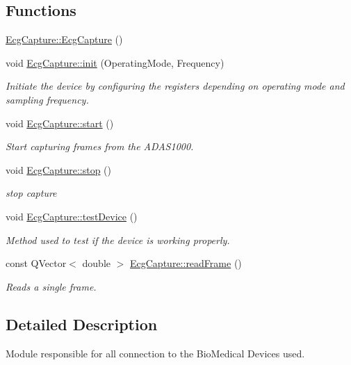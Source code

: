 \subsection*{Functions}
\begin{DoxyCompactItemize}
\item 
\hyperlink{group__Device-Facade_gaeef1c0708b94ee82330d6d165a2b5a71}{Ecg\+Capture\+::\+Ecg\+Capture} ()
\item 
void \hyperlink{group__Device-Facade_ga8f080b59e8caab0993bb7ee6b872b6a0}{Ecg\+Capture\+::init} (Operating\+Mode, Frequency)
\begin{DoxyCompactList}\small\item\em Initiate the device by configuring the registers depending on operating mode and sampling frequency. \end{DoxyCompactList}\item 
void \hyperlink{group__Device-Facade_ga9582047c81db34a3cab2bb315fcb1793}{Ecg\+Capture\+::start} ()
\begin{DoxyCompactList}\small\item\em Start capturing frames from the A\+D\+A\+S1000. \end{DoxyCompactList}\item 
void \hyperlink{group__Device-Facade_ga8fef74cdd0296256ab4a700dae2d02a4}{Ecg\+Capture\+::stop} ()
\begin{DoxyCompactList}\small\item\em stop capture \end{DoxyCompactList}\item 
void \hyperlink{group__Device-Facade_ga9f04dad928d472c92229f3f39a8f2445}{Ecg\+Capture\+::test\+Device} ()
\begin{DoxyCompactList}\small\item\em Method used to test if the device is working properly. \end{DoxyCompactList}\item 
const Q\+Vector$<$ double $>$ \hyperlink{group__Device-Facade_ga644ec3752de6ee1e818b5fcd1de5decd}{Ecg\+Capture\+::read\+Frame} ()
\begin{DoxyCompactList}\small\item\em Reads a single frame. \end{DoxyCompactList}\end{DoxyCompactItemize}


\subsection{Detailed Description}
Module responsible for all connection to the Bio\+Medical Devices used. 

